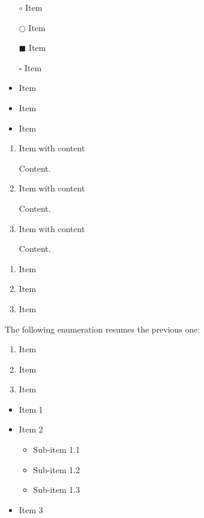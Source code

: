 \begin{itemize}
    \item[$\circ$] Item
    \item[$\bigcirc$] Item
    \item[$\blacksquare$] Item
    \item[$\square$] Item
\end{itemize}
\bigbreak
\begin{itemize}
    \item Item
    \item Item
    \item Item
\end{itemize}
\bigbreak

\begin{enumerate}

    \item Item with content
    
Content. 

    \item Item with content
    
Content. 

    \item Item with content
    
Content. 

\end{enumerate}
\bigbreak

\begin{enumerate}
    \item Item
    \item Item
    \item Item
\end{enumerate}
The following enumeration resumes the previous one:
\begin{enumerate}[resume]
    \item Item
    \item Item
    \item Item
\end{enumerate}
\bigbreak

\begin{itemize}
    \item Item 1
    \item Item 2
        \begin{itemize}
            \item Sub-item 1.1
            \item Sub-item 1.2
            \item Sub-item 1.3
        \end{itemize}
    \item Item 3
\end{itemize}
\bigbreak

